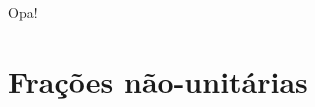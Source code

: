 \documentclass[a4,12pt]{book}
\begin{document}
\lipsum
\begin{refletindo}
 Opa!
 \lipsum[1]
\end{refletindo}

\lipsum[1]

\chapter{Frações não-unitárias}

\lipsum[2-4]
\end{document}

